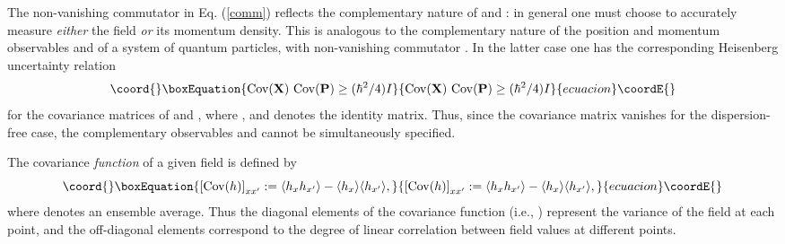 \documentclass[a4paper,preprint, showpacs, aps, draft]{revtex4}
\begin{document}
{The non-vanishing commutator in Eq. (\ref{comm}) reflects the 
complementary nature of \coordHE{} and \coordHE{}:  in general one must
choose to accurately measure {\it either} the field {\it or} its
momentum density. This is analogous to the complementary nature of the
position and momentum observables \coordHE{} and \coordHE{} of a system of
quantum particles, with non-vanishing commutator
\coordHE{}. In the latter case one has the
corresponding Heisenberg uncertainty relation \cite{cover}
\begin{equation}\coord{}\boxEquation{ \label{discrete}
{\rm Cov}({\bf X})~ {\rm Cov}({\bf P}) \geq (\hbar^2/4) I 
}{ {\rm Cov}({\bf X})~ {\rm Cov}({\bf P}) \geq (\hbar^2/4) I 
}{ecuacion}\coordE{}\end{equation}
for the covariance matrices of \coordHE{} and \coordHE{}, where \coordHE{}, and \coordHE{} denotes the identity matrix.  Thus, since the
covariance matrix vanishes for the dispersion-free case, the
complementary observables \coordHE{} and
\coordHE{} cannot be simultaneously specified.

The covariance {\it function} of a given
field \coordHE{} is defined by 
\begin{equation}\coord{}\boxEquation{ \label{hcov}
\left[{\rm Cov}(h)\right]_{xx'} := 
\langle h_xh_{x'}\rangle -
\langle h_x\rangle \langle h_{x'}\rangle ,
}{ \left[{\rm Cov}(h)\right]_{xx'} := 
\langle h_xh_{x'}\rangle -
\langle h_x\rangle \langle h_{x'}\rangle ,
}{ecuacion}\coordE{}\end{equation}
where \myHighlight{$\langle ~\rangle$}\coordHE{} denotes an ensemble average.
 Thus the diagonal elements of the covariance
function (i.e., \coordHE{}) represent the
variance of the field at each point, and the
off-diagonal elements correspond to the degree of linear correlation
between field values at different points.  

}
\end{document}
